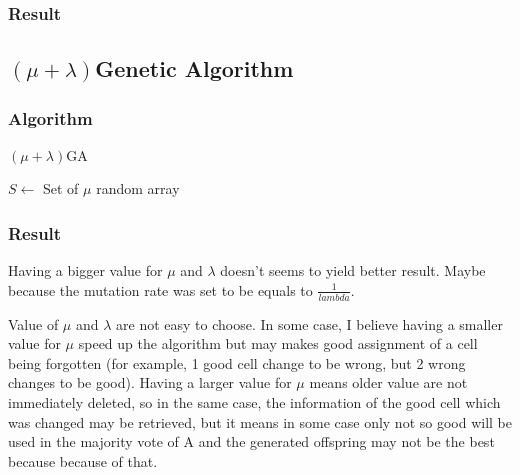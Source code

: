 \documentclass[12pt]{article}
\theoremstyle{definition}
\theoremstyle{plain}
\theoremstyle{remark}
\begin{document}
\subsubsection{Result}


\subsection{$(\mu +\lambda)$Genetic Algorithm}

\subsubsection{Algorithm}
\begin{algorithm}[H]
	\caption{$(\mu+\lambda)$GA}
	$S \leftarrow$ Set of $\mu$ random array\\
\end{algorithm}

\subsubsection{Result}


Having a bigger value for $\mu$ and $\lambda$ doesn't seems to yield better result. Maybe because the mutation rate was set to be equals to $\frac{1}{lambda}$.

Value of $\mu$ and $\lambda$ are not easy to choose. In some case, I believe having a smaller value for $\mu$ speed up the algorithm but may makes good assignment of a cell being forgotten (for example, 1 good cell change to be wrong, but 2 wrong changes to be good). Having a larger value for $\mu$ means older value are not immediately deleted, so in the same case, the information of the good cell which was changed may be retrieved, but it means in some case only not so good will be used in the majority vote of A and the generated offspring may not be the best because because of that.
\end{document}
